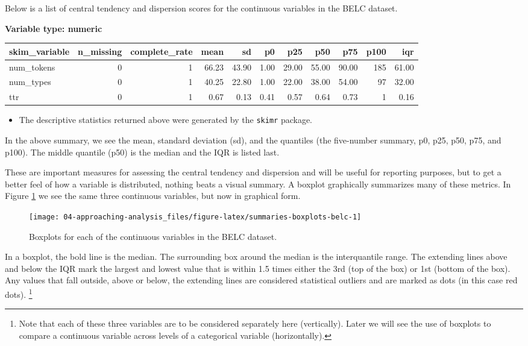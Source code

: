 \documentclass[
]{article}
\newenvironment{rmdblock}[1]
  {\begin{shaded*}
  \begin{itemize}
  \renewcommand{\labelitemi}{
    \raisebox{-.5\height}[0pt][0pt]{
      {\setkeys{Gin}{width=2em,keepaspectratio}\texttt{[image: assets/images/\#1]}}
    }
  }
  \item
  }
  {
  \end{itemize}
  \end{shaded*}
  }
\newenvironment{rmdtip}
  {\begin{rmdblock}{tip}}
  {\end{rmdblock}}
\begin{document}
Below is a list of central tendency and dispersion scores for the continuous variables in the BELC dataset.

\textbf{Variable type: numeric}

\begin{tabular}{l|r|r|r|r|r|r|r|r|r|r}
\hline
skim\_variable & n\_missing & complete\_rate & mean & sd & p0 & p25 & p50 & p75 & p100 & iqr\\
\hline
num\_tokens & 0 & 1 & 66.23 & 43.90 & 1.00 & 29.00 & 55.00 & 90.00 & 185 & 61.00\\
\hline
num\_types & 0 & 1 & 40.25 & 22.80 & 1.00 & 22.00 & 38.00 & 54.00 & 97 & 32.00\\
\hline
ttr & 0 & 1 & 0.67 & 0.13 & 0.41 & 0.57 & 0.64 & 0.73 & 1 & 0.16\\
\hline
\end{tabular}

\begin{rmdtip}
The descriptive statistics returned above were generated by the
\texttt{skimr} package.
\end{rmdtip}

In the above summary, we see the mean, standard deviation (sd), and the quantiles (the five-number summary, p0, p25, p50, p75, and p100). The middle quantile (p50) is the median and the IQR is listed last.

These are important measures for assessing the central tendency and dispersion and will be useful for reporting purposes, but to get a better feel of how a variable is distributed, nothing beats a visual summary. A boxplot graphically summarizes many of these metrics. In Figure \ref{fig:summaries-boxplots-belc} we see the same three continuous variables, but now in graphical form.

\begin{figure}

{\centering \texttt{[image: 04-approaching-analysis\_files/figure-latex/summaries-boxplots-belc-1]} 

}

\caption{Boxplots for each of the continuous variables in the BELC dataset.}\label{fig:summaries-boxplots-belc}
\end{figure}

In a boxplot, the bold line is the median. The surrounding box around the median is the interquantile range. The extending lines above and below the IQR mark the largest and lowest value that is within 1.5 times either the 3rd (top of the box) or 1st (bottom of the box). Any values that fall outside, above or below, the extending lines are considered statistical outliers and are marked as dots (in this case red dots). \footnote{Note that each of these three variables are to be considered separately here (vertically). Later we will see the use of boxplots to compare a continuous variable across levels of a categorical variable (horizontally).}
\end{document}
